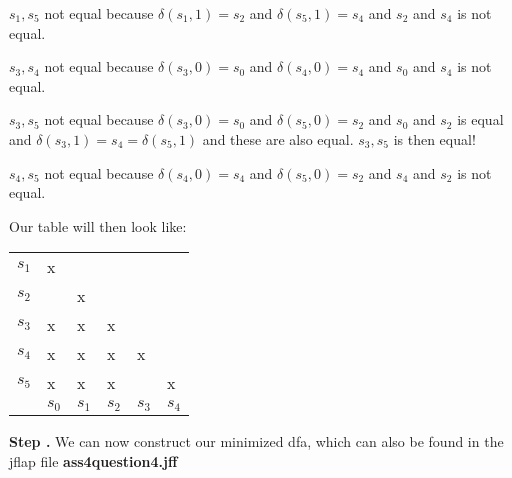 \documentclass{article}
\newcounter{step}
\newcommand\Step{%
  \stepcounter{step}%
  \textbf{Step \thestep. }%
}
\begin{document}
$s_1,s_5$ not equal because $\delta (s_1,1) = s_2$ and $\delta (s_5,1) = s_4$ and $s_2$ and $s_4$ is not
equal.

$s_3,s_4$ not equal because $\delta (s_3,0) = s_0$ and $\delta (s_4,0) = s_4$ and $s_0$ and $s_4$ is not
equal.

$s_3,s_5$ not equal because $\delta (s_3,0) = s_0$ and $\delta (s_5,0) = s_2$ and $s_0$ and $s_2$ is equal 
and $\delta (s_3,1) = s_4 = \delta (s_5,1)$ and these are also equal. $s_3, s_5$ is then equal!

$s_4,s_5$ not equal because $\delta (s_4,0) = s_4$ and $\delta (s_5,0) = s_2$ and $s_4$ and $s_2$ is not
equal.

Our table will then look like:

\begin{center}
\begin{tabular}{l*{5}{|m{.2cm}}|}
	$s_1$&x\\
	$s_2$&&x\\
	$s_3$&x&x&x\\
	$s_4$&x&x&x&x\\
	$s_5$&x&x&x&&x\\
 &
 &
 &
 &
 &
 \\
\end{tabular}
\end{center}

\newpage
\Step We can now construct our minimized dfa, which can also be found in the jflap file 
\textbf{ass4question4.jff}

\begin{center}
\end{center}
\end{document}
